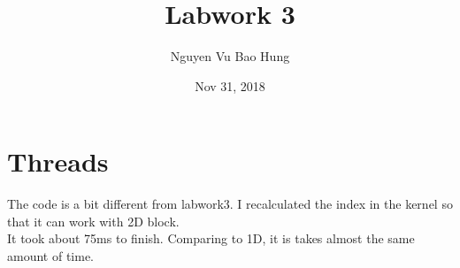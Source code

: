 \documentclass{article}
\title{Labwork 3}
\author{Nguyen Vu Bao Hung}
\date{Nov 31, 2018}
\begin{document}
\maketitle

\section{Threads}
The code is a bit different from labwork3. I recalculated the index in the kernel so that it can work with 2D block.\\
It took about 75ms to finish. Comparing to 1D, it is takes almost the same amount of time.
\end{document}
